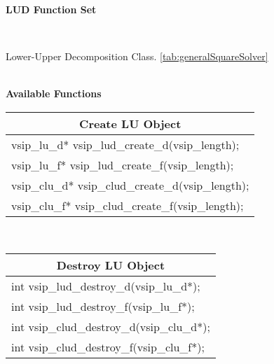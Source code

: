 \clearpage
\hypertarget{ludFunc}{\large \textbf{LUD Function Set}}\vspace{.2cm}\\
\hspace*{.3cm}
\parbox{0.85\textwidth}{Lower-Upper Decomposition Class. \ref{tab:generalSquareSolver}}
\\\cvsiplh 
\newline \hspace*{.8cm} \vspace*{.1cm} \textbf{Available Functions }
%
\newline \hspace*{1.cm} {
\ttfamily\vspace{.3cm}
\begin{tabular}[H]{|l|}
\multicolumn{1}{c}{\rmfamily \bfseries Create LU Object\vspace{.1cm}}\\ \hline
vsip\_lu\_d* vsip\_lud\_create\_d(vsip\_length);\\
vsip\_lu\_f* vsip\_lud\_create\_f(vsip\_length);\\
vsip\_clu\_d* vsip\_clud\_create\_d(vsip\_length);\\
vsip\_clu\_f* vsip\_clud\_create\_f(vsip\_length);\\
\hline\end{tabular}\\}
%
\newline \hspace*{1.cm} {
\ttfamily\vspace{.3cm}
\begin{tabular}[H]{|l|}
\multicolumn{1}{c}{\rmfamily \bfseries Destroy LU Object\vspace{.1cm}}\\ \hline
int vsip\_lud\_destroy\_d(vsip\_lu\_d*);\\
int vsip\_lud\_destroy\_f(vsip\_lu\_f*);\\
int vsip\_clud\_destroy\_d(vsip\_clu\_d*);\\
int vsip\_clud\_destroy\_f(vsip\_clu\_f*);\\
\hline\end{tabular}\\}
